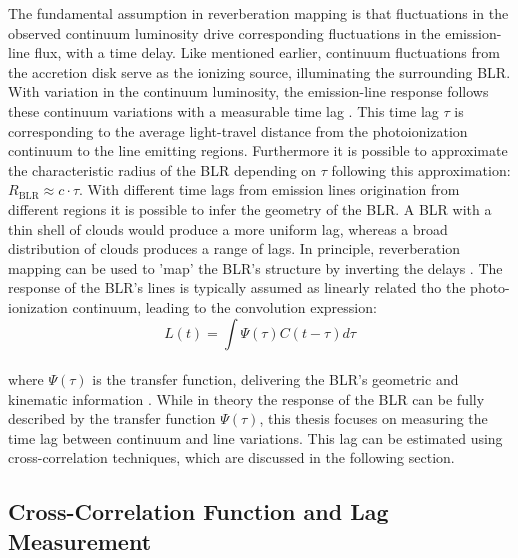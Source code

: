 The fundamental assumption in reverberation mapping is that fluctuations in the observed continuum luminosity drive corresponding fluctuations in the emission-line flux, with a time delay. Like mentioned earlier, continuum fluctuations from the accretion disk serve as the ionizing source, illuminating the surrounding BLR. With variation in the continuum luminosity, the emission-line response follows these continuum variations with a measurable time lag \parencite{Cackett2021}.
This time lag $\tau$ is corresponding to the average light-travel distance from the photoionization continuum to the line emitting regions. Furthermore it is possible to approximate the characteristic radius of the BLR depending on $\tau$ following this approximation: $R_{\mathrm{BLR}} \approx c \cdot \tau$. With different time lags from emission lines origination from different regions it is possible to infer the geometry of the BLR. A BLR with a thin shell of clouds would produce a more uniform lag, whereas a broad distribution of clouds produces a range of lags. In principle, reverberation mapping can be used to 'map' the BLR’s structure by inverting the delays \parencite{peterson1997introduction}.
The response of the BLR's lines is typically assumed as linearly related tho the photo-ionization continuum, leading to the convolution expression:
\\
\begin{equation}
	L\left(t\right) = \int \Psi\left(\tau\right)C\left(t-\tau\right) d\tau
\end{equation}
\\
where $\Psi\left(\tau\right)$ is the transfer function, delivering the BLR's geometric and kinematic information \parencite{horne2004observational}.
While in theory the response of the BLR can be fully described by the transfer function $\Psi\left(\tau\right)$, this thesis focuses on measuring the time lag between continuum and line variations. This lag can be estimated using cross-correlation techniques, which are discussed in the following section.


\subsection{Cross-Correlation Function and Lag Measurement}
\label{subsec:rm_ccf}

